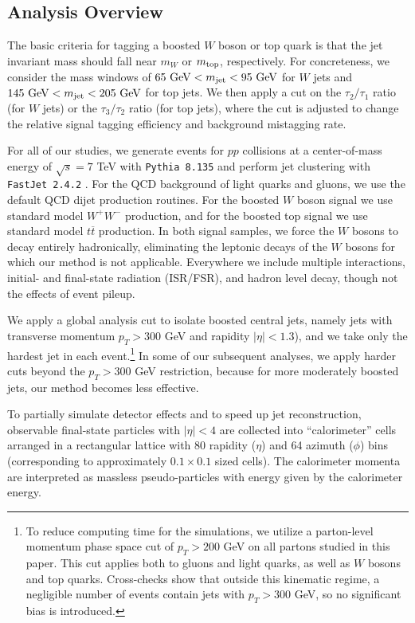 \documentclass{JHEP3}
\newcommand{\GeV}{\text{GeV}}
\begin{document}
\subsection{Analysis Overview}
\label{sec:eff_overview}

The basic criteria for tagging a boosted $W$ boson or top quark is that the jet invariant mass should fall near $m_W$ or $m_{\rm top}$, respectively.  For concreteness, we consider the mass windows of $65~\GeV < m_{\rm jet}< 95~\GeV$ for $W$ jets and $145~\GeV < m_{\rm jet} < 205~\GeV$ for top jets.  We then apply a cut on the $\tau_2 / \tau_1$ ratio (for $W$ jets) or the $\tau_3 / \tau_2$ ratio (for top jets), where the cut is adjusted to change the relative signal tagging efficiency and background mistagging rate.  

For all of our studies, we generate events for $pp$ collisions at a center-of-mass energy of $\sqrt{s} = 7$ TeV with \texttt{Pythia 8.135} \cite{Sjostrand:2006za,Sjostrand:2007gs} and perform jet clustering with \texttt{FastJet 2.4.2} \cite{FastJet,Cacciari:2005hq}.  For the QCD background of light quarks and gluons, we use the default QCD dijet production routines.   For the boosted $W$ boson signal we use standard model $W^+ W^-$ production, and for the boosted top signal we use standard model $t \overline{t}$ production.   In both signal samples, we force the $W$ bosons to decay entirely hadronically, eliminating the leptonic decays of the $W$ bosons for which our method is not applicable. Everywhere we include multiple interactions, initial- and final-state radiation (ISR/FSR), and hadron level decay, though not the effects of event pileup.  

We apply a global analysis cut to isolate boosted central jets, namely jets with transverse momentum $p_T > 300$ GeV and rapidity $|\eta| < 1.3$), and we take only the hardest jet in each event.\footnote{To reduce computing time for the simulations, we utilize a parton-level momentum phase space cut of $p_{T} > 200$ GeV on all partons studied in this paper.   This cut applies both to gluons and light quarks, as well as $W$ bosons and top quarks.  Cross-checks show that outside this kinematic regime, a negligible number of events contain jets with $p_T > 300$ GeV, so no significant bias is introduced.}  In some of our subsequent analyses, we apply harder cuts beyond the $p_T > 300$ GeV restriction, because for more moderately boosted jets, our method becomes less effective.

To partially simulate detector effects and to speed up jet reconstruction, observable final-state particles with $|\eta| < 4$ are collected into ``calorimeter'' cells arranged in a rectangular lattice with 80 rapidity ($\eta$) and 64 azimuth ($\phi$) bins (corresponding to approximately $0.1 \times 0.1$ sized cells).  The calorimeter momenta are interpreted as massless pseudo-particles with energy given by the calorimeter energy.  
\end{document}
